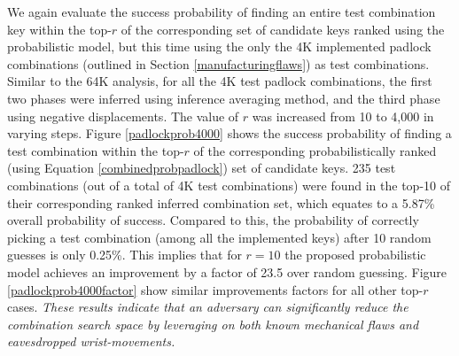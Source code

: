 \documentclass[]{IEEEtran}
\begin{document}
We again evaluate the success probability of finding an entire test combination key within the top-$r$ of the corresponding set of candidate keys ranked using the probabilistic model, but this time using the only the 4K implemented padlock combinations (outlined in Section \ref{manufacturingflaws}) as test combinations. Similar to the 64K analysis, for all the 4K test padlock combinations, the first two phases were inferred using inference averaging method, and the third phase using negative displacements. The value of $r$ was increased from 10 to 4,000 in varying steps. Figure \ref{padlockprob4000} shows the success probability of finding a test combination within the top-$r$ of the corresponding probabilistically ranked (using Equation \ref{combinedprobpadlock}) set of candidate keys. 235 test combinations (out of a total of 4K test combinations) were found in the top-10 of their corresponding ranked inferred combination set, which equates to a 5.87\% overall probability of success. Compared to this, the probability of correctly picking a test combination (among all the implemented keys) after 10 random guesses is only 0.25\%. This implies that for $r=10$ the proposed probabilistic model achieves an improvement by a factor of 23.5 over random guessing. Figure \ref{padlockprob4000factor} show similar improvements factors for all other top-$r$ cases. \emph{These results indicate that an adversary can significantly reduce the combination search space by leveraging on both known mechanical flaws and eavesdropped wrist-movements.}
\end{document}

